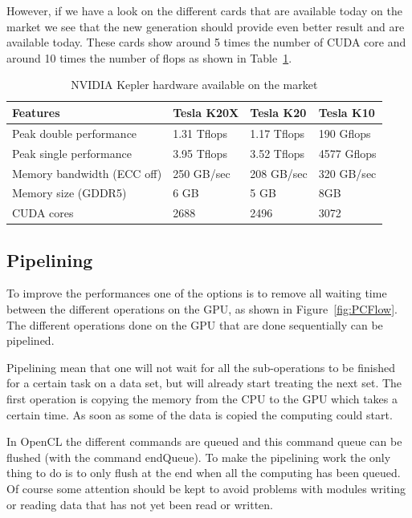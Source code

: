 However, if we have a look on the different cards that are available today on the market we see that the new generation should provide even better result and are available today. These cards show around 5 times the number of \gls{CUDA} core and around 10 times the number of \gls{flops} as shown in Table~\ref{tab:kepler}.

\begin{table}[H]
\centering
\caption{NVIDIA Kepler hardware available on the market}
\label{tab:kepler}
\begin{tabular}{|l|l|l|l|}
\hline
Features & Tesla K20X & Tesla K20 & Tesla K10 \\
\hline
\hline
Peak double performance & 1.31 Tflops & 1.17 Tflops & 190 Gflops \\
\hline
Peak single performance & 3.95 Tflops & 3.52 Tflops & 4577 Gflops \\
\hline
Memory bandwidth (ECC off) & 250 GB/sec & 208 GB/sec & 320 GB/sec \\
\hline
Memory size (GDDR5) & 6 GB & 5 GB & 8GB \\
\hline
CUDA cores & 2688 & 2496 & 3072 \\
\hline
\end{tabular}
\end{table}


\subsection{Pipelining}

To improve the performances one of the options is to remove all waiting time between the different operations on the \gls{GPU}, as shown in Figure~\ref{fig:PCFlow}. The different operations done on the \gls{GPU} that are done sequentially can be pipelined.

Pipelining mean that one will not wait for all the sub-operations to be finished for a certain task on a data set, but will already start treating the next set. The first operation is copying the memory from the \gls{CPU} to the \gls{GPU} which takes a certain time. As soon as some of the data is copied the computing could start.

In \gls{OpenCL} the different commands are queued and this command queue can be flushed (with the command endQueue). To make the pipelining work the only thing to do is to only flush at the end when all the computing has been queued. Of course some attention should be kept to avoid problems with modules writing or reading data that has not yet been read or written.

